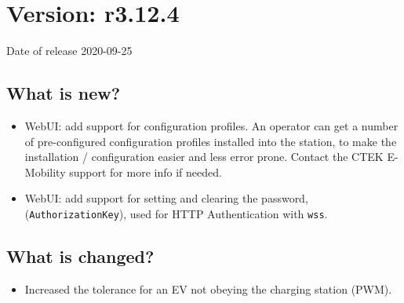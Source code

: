 \documentclass{scrartcl}
\begin{document}
\section{Version: r3.12.4}
Date of release 2020-09-25
\subsection*{What is new?}
\begin{itemize}
\item WebUI: add support for configuration profiles. An operator can get a
  number of pre-configured configuration profiles installed into the station,
  to make the installation / configuration easier and less error
  prone. Contact the CTEK E-Mobility support for more info if needed.
\item WebUI: add support for setting and clearing the password,
  (\verb|AuthorizationKey|), used for HTTP Authentication with \verb|wss|.
\end{itemize}
\subsection*{What is changed?}
\begin{itemize}
\item Increased the tolerance for an EV not obeying the charging station (PWM).
\end{itemize}
\end{document}
